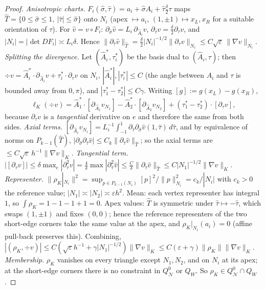\documentclass[11pt]{article}
\theoremstyle{remark}
\newcommand{\norm}[1]{\|#1\|}
\newcommand{\Nset}{\mathcal N}
\begin{document}
\begin{proof}
\emph{Anisotropic charts.} $F_i(\hat\sigma,\hat\tau)=a_i+\hat\sigma A_i+\hat\tau\frac\delta2\tau$ maps $\hat T=\{0\le\hat\sigma\le1,\ |\hat\tau|\le\hat\sigma\}$ onto $N_i$
(apex $\mapsto a_i$, $(1,\pm1)\mapsto x_L,x_R$ for a suitable orientation of $\tau$). For $\hat v=v\circ F_i$:
$\partial_{\hat\sigma}\hat v=L_i\,\partial_{\hat A_i}v$, $\partial_{\hat\tau}\hat v=\frac\delta2\partial_\tau v$, and $|N_i|=|\det DF_i|\asymp L_i\delta$. Hence
$\norm{\partial_{\hat\tau}\hat v}_{\hat T}=\frac\delta2|N_i|^{-1/2}\norm{\partial_\tau v}_{N_i}\le C\sqrt{\varepsilon}\,\norm{\nabla v}_{N_i}$.
\emph{Splitting the divergence.} Let $(\hat A_i^*,\tau_i^*)$ be the basis dual to $(\hat A_i,\tau)$; then $\div v=\hat A_i^*\cdot\partial_{\hat A_i}v+\tau_i^*\cdot\partial_\tau v$ on $N_i$,
$|\hat A_i^*|,|\tau_i^*|\le C$ (the angle between $A_i$ and $\tau$ is bounded away from $0,\pi$), and $|\tau_1^*-\tau_2^*|\le C\gamma$. Writing $[g]:=g(x_L)-g(x_R)$,
\[
\ell_K(\div v)=\hat A_1^*\cdot[\partial_{\hat A_1}v_{N_1}]-\hat A_2^*\cdot[\partial_{\hat A_2}v_{N_2}]+(\tau_1^*-\tau_2^*)\cdot[\partial_\tau v],
\]
because $\partial_\tau v$ is a \emph{tangential} derivative on $e$ and therefore the same from both sides.
\emph{Axial terms.} $[\partial_{\hat A_i}v_{N_i}]=L_i^{-1}\int_{-1}^1\partial_{\hat\tau}\partial_{\hat\sigma}\hat v(1,\hat\tau)\,d\hat\tau$, and by equivalence of norms on
$P_{k-1}(\hat T)$, $|\partial_{\hat\sigma}\partial_{\hat\tau}\hat v|\le C_k\norm{\partial_{\hat\tau}\hat v}_{\hat T}$; so the axial terms are $\le C\sqrt\varepsilon\,h^{-1}\norm{\nabla v}_K$.
\emph{Tangential term.} $|[\partial_\tau v]|\le\delta\max_e|\partial_\tau^2v|=\frac4\delta\max|\partial^2_{\hat\tau}\hat v|\le\frac{C}{\delta}\norm{\partial_{\hat\tau}\hat v}_{\hat T}\le C|N_1|^{-1/2}\norm{\nabla v}_K$.
\emph{Representer.} $\norm{\rho_K|_{N_i}}^2=\sup_{p\in P_{k-1}(N_i)}[p]^2/\norm p^2_{N_i}=c_k/|N_i|$ with $c_k>0$ the reference value; $|N_1|\asymp|N_2|\asymp\varepsilon h^2$.
Mean: each vertex representer has integral $1$, so $\int\rho_K=1-1-1+1=0$. Apex values: $\hat T$ is symmetric under $\hat\tau\mapsto-\hat\tau$, which swaps
$(1,\pm1)$ and fixes $(0,0)$; hence the reference representers of the two short-edge corners take the same value at the apex, and
$\rho_K|_{N_i}(a_i)=0$ (affine pull-back preserves this). Combining, $|(\rho_K,\div v)|\le C(\sqrt\varepsilon h^{-1}+\gamma|N_1|^{-1/2})\norm{\nabla v}_K\le C(\varepsilon+\gamma)\norm{\rho_K}\norm{\nabla v}_K$.
\emph{Membership.} $\rho_K$ vanishes on every triangle except $N_1,N_2$, and on $N_i$ at its apex; at the short-edge corners there is no
constraint in $Q^0_\Nset$ or $Q_W$. So $\rho_K\in Q^0_\Nset\cap Q_W$.
\end{proof}
\end{document}
